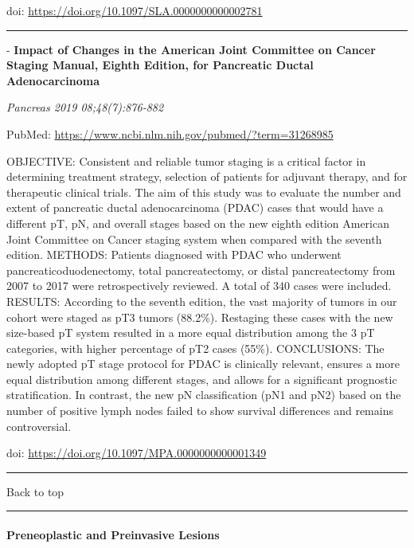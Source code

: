 \documentclass[
]{article}
\renewcommand{\linethickness}{0.05em}
\begin{document}
doi: \url{https://doi.org/10.1097/SLA.0000000000002781}

\begin{center}\rule{0.5\linewidth}{\linethickness}\end{center}

- \textbf{Impact of Changes in the American Joint Committee on Cancer
Staging Manual, Eighth Edition, for Pancreatic Ductal Adenocarcinoma}

\emph{Pancreas 2019 08;48(7):876-882}

PubMed: \url{https://www.ncbi.nlm.nih.gov/pubmed/?term=31268985}

OBJECTIVE: Consistent and reliable tumor staging is a critical factor in
determining treatment strategy, selection of patients for adjuvant
therapy, and for therapeutic clinical trials. The aim of this study was
to evaluate the number and extent of pancreatic ductal adenocarcinoma
(PDAC) cases that would have a different pT, pN, and overall stages
based on the new eighth edition American Joint Committee on Cancer
staging system when compared with the seventh edition. METHODS: Patients
diagnosed with PDAC who underwent pancreaticoduodenectomy, total
pancreatectomy, or distal pancreatectomy from 2007 to 2017 were
retrospectively reviewed. A total of 340 cases were included. RESULTS:
According to the seventh edition, the vast majority of tumors in our
cohort were staged as pT3 tumors (88.2\%). Restaging these cases with
the new size-based pT system resulted in a more equal distribution among
the 3 pT categories, with higher percentage of pT2 cases (55\%).
CONCLUSIONS: The newly adopted pT stage protocol for PDAC is clinically
relevant, ensures a more equal distribution among different stages, and
allows for a significant prognostic stratification. In contrast, the new
pN classification (pN1 and pN2) based on the number of positive lymph
nodes failed to show survival differences and remains controversial.

doi: \url{https://doi.org/10.1097/MPA.0000000000001349}

\begin{center}\rule{0.5\linewidth}{\linethickness}\end{center}

Back to top

\begin{center}\rule{0.5\linewidth}{\linethickness}\end{center}

\pagebreak

\hypertarget{pancreas_preinvasive}{%
\paragraph{Preneoplastic and Preinvasive
Lesions}\label{pancreas_preinvasive}}
\end{document}
